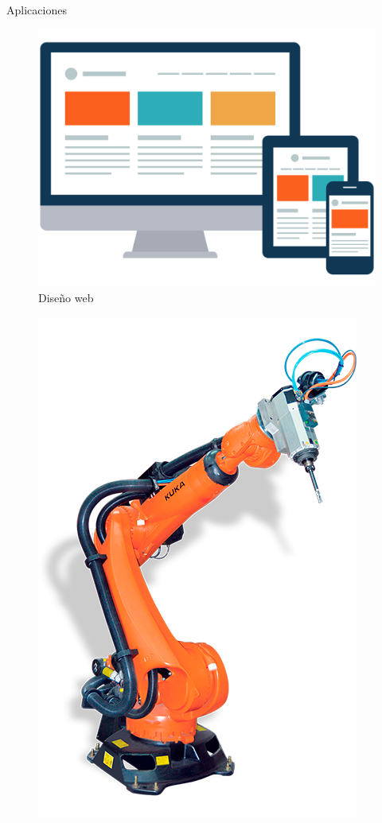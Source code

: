 \documentclass{beamer}
\begin{document}
\begin{frame}[t]{Aplicaciones}\vspace{24pt}
	\begin{multicols}{3}
		\begin{figure}
			\centering
			\includegraphics[scale=0.07]{webdesign}
			\caption{Diseño web}
		\end{figure}
		\begin{figure}
			\centering
			\includegraphics[scale=0.23]{industry}

\end{figure}
\end{multicols}
\end{frame}
\end{document}
